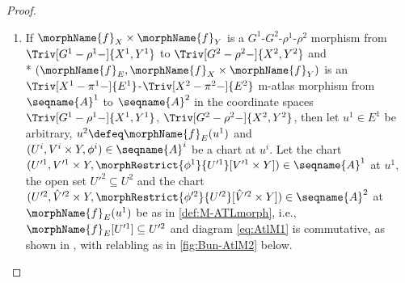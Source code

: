 \documentclass{article}
\begin{document}
\begin{lemma}
\begin{proof}
\begin{enumerate}
Let $(U^i, V^i \times Y^i, \phi^i) \in \seqname{A}^i$, $i=1,2$,
$u^1 \in I \defeq U^1 \cap \morphName{f}^{-1}_E[U^2]$. Let the chart
$
  (U'^1, V'^1 \times Y, \phi^1 \maps U'^1 \toiso V'^1)
  \in \seqname{A}^1
$
at $u^1$, the open set $U'^2 \subseteq U^2$ and the chart
$
  (U'^2 ,\hat{V}'^2 \times Y, \phi'^2 \maps U'^2 \toiso \hat{V}'^2 \times Y)
  \in \seqname{A}^2
$
at $\morphName{f}_E(u^1)$ be as in \cref{def:Bun-ATLmorph} above, i.e.,
$\morphName{f}_E[U'^1] \subseteq U'^2$ and diagram \eqref{eq:Bun-AtlM1}
is commutative, as shown in
{
  \showlabelsinline
  \cref{fig:Bun-AtlM1}.
}
This is a relabling of the commutative diagram in
.

\item
If $\morphName{f}_X \times \morphName{f}_Y$ is a
$G^1$-$G^2$-$\rho^1$-$\rho^2$ morphism from
$\Triv[G^1-\rho^1-]{X^1,Y^1}$ to $\Triv[G^2-\rho^2-]{X^2,Y^2}$ and \\*
$(\morphName{f}_E, \morphName{f}_X \times \morphName{f}_Y)$ is an
$\Triv[X^1-\pi^1-]{E^1}$-$\Triv[X^2-\pi^2-]{E^2}$ m-atlas morphism from
$\seqname{A}^1$ to $\seqname{A}^2$ in the coordinate spaces
$\Triv[G^1-\rho^1-]{X^1,Y^1}$, $\Triv[G^2-\rho^2-]{X^2,Y^2}$, then let
$u^1 \in E^1$ be arbitrary, $u^2 \defeq \morphName{f}_E(u^1)$ and
\nobreaks
  {{
    $(U^i, V^i \times Y, \phi^i) \in \seqname{A}^i$
  }}
be a chart at $u^i$. Let the chart
\nobreaks
  {{
    $
      (U'^1, V'^1 \times Y, \morphRestrict{\phi^1}{U'^1}[V'^1 \times Y])
      \in \seqname{A}^1
    $
  }}
at $u^1$, the open set $U'^2 \subseteq U^2$ and the chart
\nobreaks
  {{
    $
      (
        U'^2,
        \hat{V}'^2 \times Y,
        \morphRestrict{\phi'^2}{U'^2}[\hat{V}'^2 \times Y]
      )
      \in \seqname{A}^2
    $
  }}
at $\morphName{f}_E(u^1)$ be as in \cref{def:M-ATLmorph}, i.e.,
$\morphName{f}_E[U'^1] \subseteq U'^2$ and diagram \eqref{eq:AtlM1}
is commutative, as shown in
{
  \showlabelsinline
  ,
}
with relabling as in \cref{fig:Bun-AtlM2} below.


\end{enumerate}
\end{proof}
\end{lemma}
\end{document}
